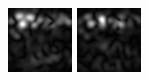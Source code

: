 \begin{figure}[ht]
\begin{center}
 \includegraphics[width=\columnwidth/9]{ch4/figures/mag_-1_5.jpg}
 \includegraphics[width=\columnwidth/9]{ch4/figures/mag_-1_6.jpg}

\end{center}
\end{figure}

